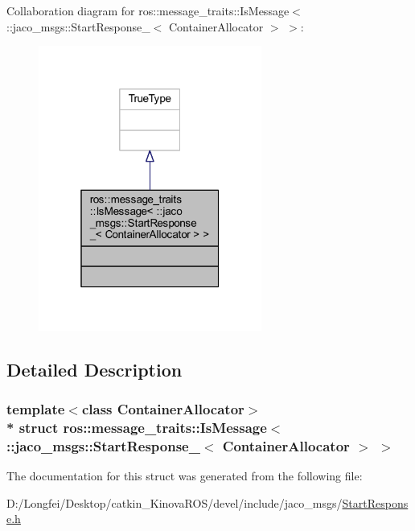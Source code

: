 Collaboration diagram for ros\+:\+:message\+\_\+traits\+:\+:Is\+Message$<$ \+:\+:jaco\+\_\+msgs\+:\+:Start\+Response\+\_\+$<$ Container\+Allocator $>$ $>$\+:
\nopagebreak
\begin{figure}[H]
\begin{center}
\leavevmode
\includegraphics[width=208pt]{db/dbc/structros_1_1message__traits_1_1IsMessage_3_01_1_1jaco__msgs_1_1StartResponse___3_01ContainerAllocator_01_4_01_4__coll__graph}
\end{center}
\end{figure}


\subsection{Detailed Description}
\subsubsection*{template$<$class Container\+Allocator$>$\\*
struct ros\+::message\+\_\+traits\+::\+Is\+Message$<$ \+::jaco\+\_\+msgs\+::\+Start\+Response\+\_\+$<$ Container\+Allocator $>$ $>$}



The documentation for this struct was generated from the following file\+:\begin{DoxyCompactItemize}
\item 
D\+:/\+Longfei/\+Desktop/catkin\+\_\+\+Kinova\+R\+O\+S/devel/include/jaco\+\_\+msgs/\hyperlink{StartResponse_8h}{Start\+Response.\+h}\end{DoxyCompactItemize}

